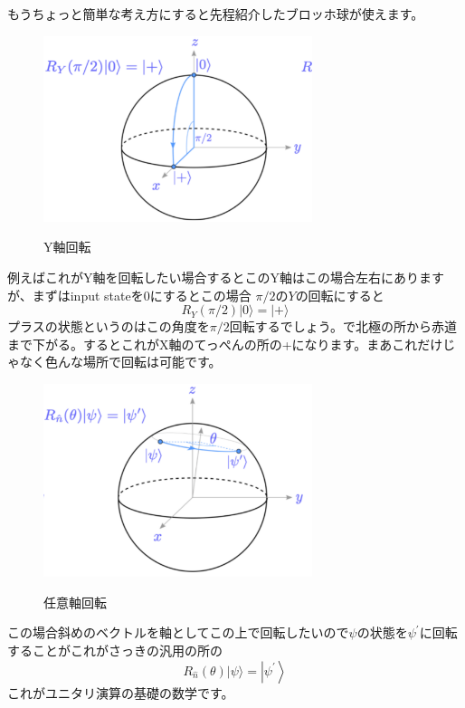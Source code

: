もうちょっと簡単な考え方にすると先程紹介したブロッホ球が使えます。
\begin{figure}[H]
    \centering
    \includegraphics[width=0.7\textwidth]{lesson2/bloch_y_axis.pdf}
    \label{fig: 1}
    \begin{center}
        \caption{Y軸回転}
    \end{center}
\end{figure}
例えばこれがY軸を回転したい場合するとこのY軸はこの場合左右にありますが、まずはinput stateを0にするとこの場合
$\pi/2$の$Y$の回転にすると
\begin{equation}
R_{Y}(\pi / 2)|0\rangle=|+\rangle
\end{equation}
プラスの状態というのはこの角度を$\pi/2$回転するでしょう。で北極の所から赤道まで下がる。するとこれがX軸のてっぺんの所の+になります。まあこれだけじゃなく色んな場所で回転は可能です。
\begin{figure}[H]
    \centering
    \includegraphics[width=0.7\textwidth]{lesson2/bloch_general_axis.pdf}
    \label{fig: 1}
    \begin{center}
        \caption{任意軸回転}
    \end{center}
\end{figure}
この場合斜めのベクトルを軸としてこの上で回転したいので$\psi$の状態を$\psi^\prime$に回転することがこれがさっきの汎用の所の
\begin{equation}
R_{\hat{n}}(\theta)|\psi\rangle=\left|\psi^{\prime}\right\rangle
\end{equation}
これがユニタリ演算の基礎の数学です。

